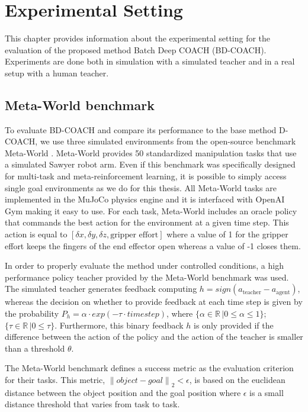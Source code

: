\chapter{Experimental Setting}
\label{chapter:Experimental Setting}

This chapter provides information about the experimental setting for the evaluation of the proposed method Batch Deep COACH (BD-COACH). Experiments are done both in simulation with a simulated teacher and in a real setup with a human teacher.


\section{Meta-World benchmark}
\label{section:Meta-World Benchmark}
To evaluate BD-COACH and compare its performance to the base method D-COACH, we use three simulated environments from the open-source benchmark Meta-World \cite{metaworld}. Meta-World 
provides 50 standardized manipulation tasks that use a simulated Sawyer robot arm. Even if this benchmark was specifically designed for multi-task and meta-reinforcement learning, it is possible to simply access single goal environments as we do for this thesis. All Meta-World tasks are implemented in the MuJoCo physics engine \cite{mujoco} and it is interfaced with OpenAI Gym \cite{openai} making it easy to use. 
For each task, Meta-World includes an oracle policy that commands the best action for the environment at a given time step. This action is equal to 
$[\delta x, \delta y, \delta z, \textrm{gripper effort}]$
where a value of 1 for the gripper effort keeps the fingers of the end effector open whereas a value of -1 closes them.



In order to properly evaluate the method under controlled conditions, a high performance policy teacher provided by the Meta-World benchmark was used. The simulated teacher generates feedback computing $h = sign(a_\text{teacher} - a_\text{agent})$, whereas the decision on whether to provide feedback at each time step is given by the probability $P_h = \alpha \cdot exp(-\tau \cdot timestep)$, where $\{\alpha \in \mathbb{R}\, | 0 \leq \alpha \leq 1 \}$; $\{\tau \in \mathbb{R} \, | 0 \leq \tau\}$. Furthermore, this binary feedback $h$ is only provided if the difference between the action of the policy and the action of the teacher is smaller than a threshold $\theta$.

The Meta-World benchmark defines a success metric as the evaluation criterion for their tasks. This metric, ${\left\lVert object-goal \right\rVert}_2 < \epsilon$, is based on the euclidean distance between the object position and the goal position where $\epsilon$ is a small distance threshold that varies from task to task.




